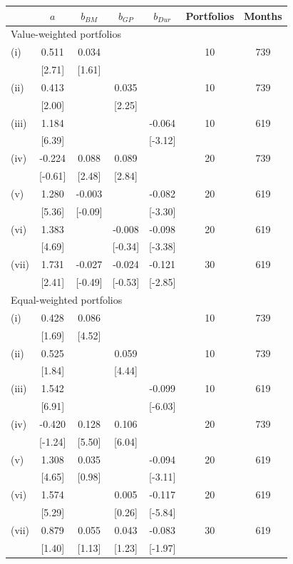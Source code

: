 \begin{tabular}{lcccccc}
\toprule
 & $a$ & $b_{\mathit{BM}}$ & $b_{\mathit{GP}}$ & $b_{\mathit{Dur}}$ & Portfolios & Months \\
\midrule
\multicolumn{7}{l}{Value-weighted portfolios} \\
\addlinespace
(i) & 0.511 & 0.034 &  &  & 10 & 739 \\
 & [2.71] & [1.61] &  &  &  &  \\
(ii) & 0.413 &  & 0.035 &  & 10 & 739 \\
 & [2.00] &  & [2.25] &  &  &  \\
(iii) & 1.184 &  &  & -0.064 & 10 & 619 \\
 & [6.39] &  &  & [-3.12] &  &  \\
(iv) & -0.224 & 0.088 & 0.089 &  & 20 & 739 \\
 & [-0.61] & [2.48] & [2.84] &  &  &  \\
(v) & 1.280 & -0.003 &  & -0.082 & 20 & 619 \\
 & [5.36] & [-0.09] &  & [-3.30] &  &  \\
(vi) & 1.383 &  & -0.008 & -0.098 & 20 & 619 \\
 & [4.69] &  & [-0.34] & [-3.38] &  &  \\
(vii) & 1.731 & -0.027 & -0.024 & -0.121 & 30 & 619 \\
 & [2.41] & [-0.49] & [-0.53] & [-2.85] &  &  \\
\midrule
\multicolumn{7}{l}{Equal-weighted portfolios} \\
\addlinespace
(i) & 0.428 & 0.086 &  &  & 10 & 739 \\
 & [1.69] & [4.52] &  &  &  &  \\
(ii) & 0.525 &  & 0.059 &  & 10 & 739 \\
 & [1.84] &  & [4.44] &  &  &  \\
(iii) & 1.542 &  &  & -0.099 & 10 & 619 \\
 & [6.91] &  &  & [-6.03] &  &  \\
(iv) & -0.420 & 0.128 & 0.106 &  & 20 & 739 \\
 & [-1.24] & [5.50] & [6.04] &  &  &  \\
(v) & 1.308 & 0.035 &  & -0.094 & 20 & 619 \\
 & [4.65] & [0.98] &  & [-3.11] &  &  \\
(vi) & 1.574 &  & 0.005 & -0.117 & 20 & 619 \\
 & [5.29] &  & [0.26] & [-5.84] &  &  \\
(vii) & 0.879 & 0.055 & 0.043 & -0.083 & 30 & 619 \\
 & [1.40] & [1.13] & [1.23] & [-1.97] &  &  \\
\bottomrule
\end{tabular}
